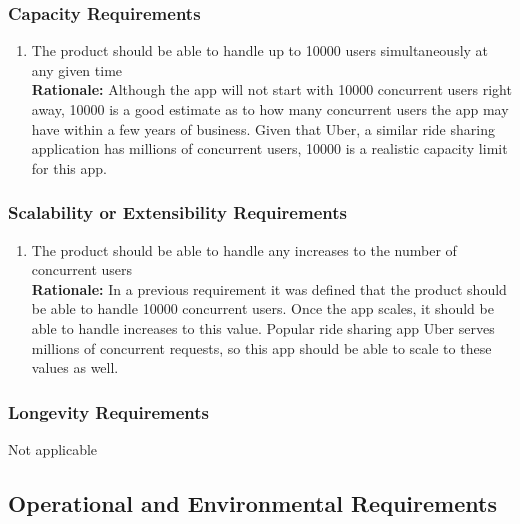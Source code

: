 \documentclass[]{article}
\begin{document}
\subsubsection{Capacity Requirements}
\label{ssub:capacity_requirements}
\begin{enumerate}[{PR-C}1. ]
	\item The product should be able to handle up to 10000 users simultaneously at any given time \\
	{\bf Rationale:} Although the app will not start with 10000 concurrent users right away, 10000 is a good estimate as to how many concurrent users the app may have within a few years of business. Given that Uber, a similar ride sharing application has millions of concurrent users, 10000 is a realistic capacity limit for this app.
\end{enumerate}

\subsubsection{Scalability or Extensibility Requirements}
\label{ssub:scalability_or_extensibility_requirements}
\begin{enumerate}[{PR-SE}1. ]
	\item The product should be able to handle any increases to the number of concurrent users \\
	{\bf Rationale:} In a previous requirement it was defined that the product should be able to handle 10000 concurrent users. Once the app scales, it should be able to handle increases to this value. Popular ride sharing app Uber serves millions of concurrent requests, so this app should be able to scale to these values as well.
\end{enumerate}

\subsubsection{Longevity Requirements}
\label{ssub:longevity_requirements}
	Not applicable


\subsection{Operational and Environmental Requirements}
\label{sub:operational_and_environmental_requirements}
\end{document}
